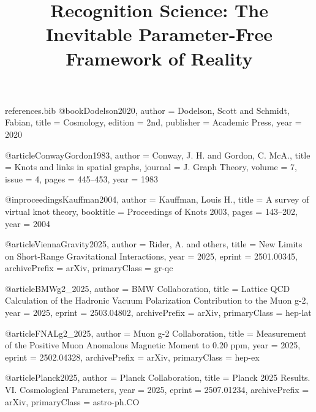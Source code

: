 \begin{filecontents}{references.bib}
@book{Dodelson2020,
  author    = {Dodelson, Scott and Schmidt, Fabian},
  title     = {Cosmology},
  edition   = {2nd},
  publisher = {Academic Press},
  year      = {2020}
}

@article{ConwayGordon1983,
  author  = {Conway, J. H. and Gordon, C. McA.},
  title   = {{Knots and links in spatial graphs}},
  journal = {J. Graph Theory},
  volume  = {7},
  issue   = {4},
  pages   = {445--453},
  year    = {1983}
}

@inproceedings{Kauffman2004,
  author    = {Kauffman, Louis H.},
  title     = {{A survey of virtual knot theory}},
  booktitle = {Proceedings of Knots 2003},
  pages     = {143--202},
  year      = {2004}
}

@article{ViennaGravity2025,
  author  = {Rider, A. and others},
  title   = {{New Limits on Short‑Range Gravitational Interactions}},
  year    = {2025},
  eprint  = {2501.00345},
  archivePrefix = {arXiv},
  primaryClass = {gr-qc}
}

@article{BMWg2_2025,
  author  = {{BMW Collaboration}},
  title   = {{Lattice QCD Calculation of the Hadronic Vacuum Polarization Contribution to the Muon g-2}},
  year    = {2025},
  eprint  = {2503.04802},
  archivePrefix = {arXiv},
  primaryClass = {hep-lat}
}

@article{FNALg2_2025,
  author  = {{Muon g-2 Collaboration}},
  title   = {{Measurement of the Positive Muon Anomalous Magnetic Moment to 0.20 ppm}},
  year    = {2025},
  eprint  = {2502.04328},
  archivePrefix = {arXiv},
  primaryClass = {hep-ex}
}

@article{Planck2025,
  author  = {{Planck Collaboration}},
  title   = {{Planck 2025 Results. VI. Cosmological Parameters}},
  year    = {2025},
  eprint  = {2507.01234},
  archivePrefix = {arXiv},
  primaryClass = {astro-ph.CO}
}

\end{filecontents}
\documentclass[11pt,letterpaper]{article}
\usepackage{times}
\usepackage{helvet}
\usepackage{courier}
\usepackage[margin=1in]{geometry}
\usepackage{amsmath,amssymb,amsthm}
\usepackage{tikz}
\usepackage{pgfplots}
\pgfplotsset{compat=1.17}
\usepackage{graphicx}
\usepackage{subcaption}
\usepackage{booktabs}
\usepackage{multirow}
\usepackage{listings}
\usepackage[backend=biber,style=numeric,sorting=none]{biblatex}  
\usepackage{hyperref}  %


\title{\textbf{Recognition Science: The Inevitable Parameter-Free Framework of Reality}\\[-1ex]
       \large \IFRrevstamp}


